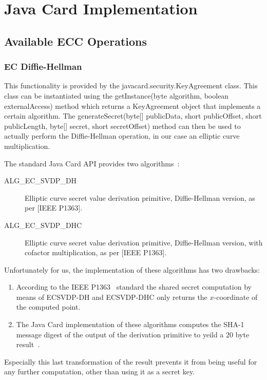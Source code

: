 \section{Java Card Implementation}

\subsection{Available ECC Operations}

\subsubsection{EC Diffie-Hellman}

This functionality is provided by the javacard.security.KeyAgreement class. This
class can be instantiated using the getInstance(byte algorithm, boolean externalAccess)
method which returns a KeyAgreement object that implements a certain algorithm.
The generateSecret(byte[] publicData, short publicOffset, short publicLength, byte[] secret, short secretOffset)
method can then be used to actually perform the Diffie-Hellman operation, in our
case an elliptic curve multiplication.

The standard Java Card API provides two algorithms~\cite{JavaCard-2.2.2_API_documentation}:
\begin{description}
  \item[ALG\_EC\_SVDP\_DH] Elliptic curve secret value derivation primitive, Diffie-Hellman version, as per [IEEE P1363].
  \item[ALG\_EC\_SVDP\_DHC] Elliptic curve secret value derivation primitive, Diffie-Hellman version, with cofactor multiplication, as per [IEEE P1363].
\end{description}

Unfortunately for us, the implementation of these algorithms has two drawbacks:
\begin{enumerate}
  \item According to the IEEE P1363~\cite{IEEE_P1363} standard the shared secret computation by means of ECSVDP-DH and ECSVDP-DHC only returns the $x$-coordinate of the computed point.
  \item The Java Card implementation of these algorithms computes the SHA-1 message digest of the output of the derivation primitive to yeild a 20 byte result~\cite{JavaCard-2.2.2_API_documentation}.
\end{enumerate}

Especially this last transformation of the result prevents it from being useful for any further computation, other than using it as a secret key.


